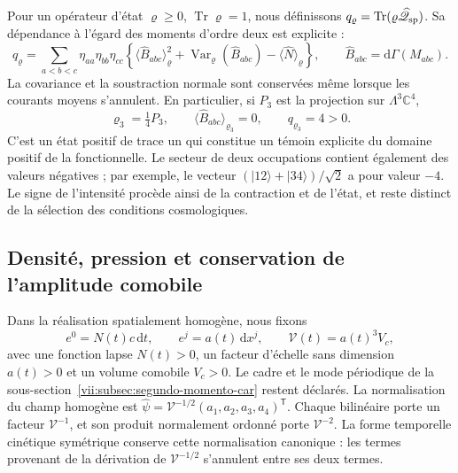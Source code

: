 Pour un opérateur d'état \(\varrho\geq0\),
\(\operatorname{Tr}\varrho=1\), nous définissons
\(q_\varrho=\operatorname{Tr}(\varrho\widehat{\mathscr Q}_{\rm sp})\).
Sa dépendance à l'égard des moments d'ordre deux est explicite :
\begin{equation}
 q_\varrho=\sum_{a<b<c}\eta_{aa}\eta_{bb}\eta_{cc}
 \left\{
  \langle\widehat B_{abc}\rangle_\varrho^2
  +\operatorname{Var}_\varrho(\widehat B_{abc})
  -\langle\widehat N\rangle_\varrho
 \right\},\qquad
 \widehat B_{abc}=\mathrm d\Gamma(M_{abc}).
 \label{vii:eq:covarianza-espin-material}
\end{equation}
La covariance et la soustraction normale sont conservées même lorsque
les courants moyens s'annulent. En particulier, si \(P_3\) est la
projection sur \(\Lambda^3\mathbb C^4\),
\begin{equation}
 \varrho_3=\tfrac14P_3,\qquad
 \langle\widehat B_{abc}\rangle_{\varrho_3}=0,\qquad
 q_{\varrho_3}=4>0.
 \label{vii:eq:testigo-positivo-espin}
\end{equation}
C'est un état positif de trace un qui constitue un témoin explicite
du domaine positif de la fonctionnelle. Le secteur de deux occupations
contient également des valeurs négatives ; par exemple, le vecteur
\((|12\rangle+|34\rangle)/\sqrt2\) a pour valeur \(-4\).
Le signe de l'intensité procède ainsi de la contraction et de
l'état, et reste distinct de la sélection des conditions cosmologiques.

\subsection{Densité, pression et conservation de l'amplitude comobile}
\label{vii:subsec:amplitud-espinorial-comovil}

Dans la réalisation spatialement homogène, nous fixons
\[
 e^0=N(t)c\,\mathrm dt,\qquad e^j=a(t)\,\mathrm dx^j,
 \qquad \mathcal V(t)=a(t)^3V_c,
\]
avec une fonction lapse \(N(t)>0\), un facteur d'échelle sans dimension \(a(t)>0\)
et un volume comobile \(V_c>0\). Le cadre et le mode périodique de la
sous-section~\ref{vii:subsec:segundo-momento-car} restent déclarés.
La normalisation du champ homogène est
\(\widehat\psi=\mathcal V^{-1/2}(a_1,a_2,a_3,a_4)^{\mathsf T}\).
Chaque bilinéaire porte un facteur \(\mathcal V^{-1}\), et son produit
normalement ordonné porte \(\mathcal V^{-2}\). La forme temporelle
cinétique symétrique conserve cette normalisation canonique : les termes
provenant de la dérivation de \(\mathcal V^{-1/2}\) s'annulent entre
ses deux termes.

